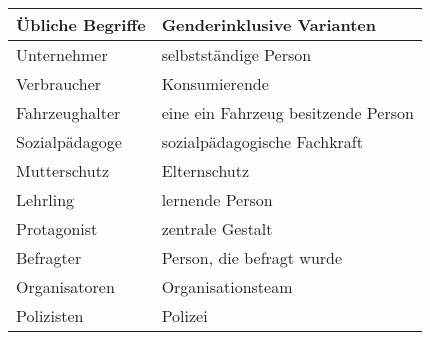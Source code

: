
\begin{tabular}{ll}
\toprule
Übliche Begriffe & Genderinklusive Varianten\\
\midrule
Unternehmer & selbstständige Person\\
Verbraucher & Konsumierende\\
Fahrzeughalter & eine ein Fahrzeug besitzende Person\\
Sozialpädagoge & sozialpädagogische Fachkraft\\
Mutterschutz & Elternschutz\\
Lehrling & lernende Person\\
Protagonist & zentrale Gestalt\\
Befragter & Person, die befragt wurde\\
Organisatoren & Organisationsteam\\
Polizisten & Polizei\\
\bottomrule
\end{tabular}